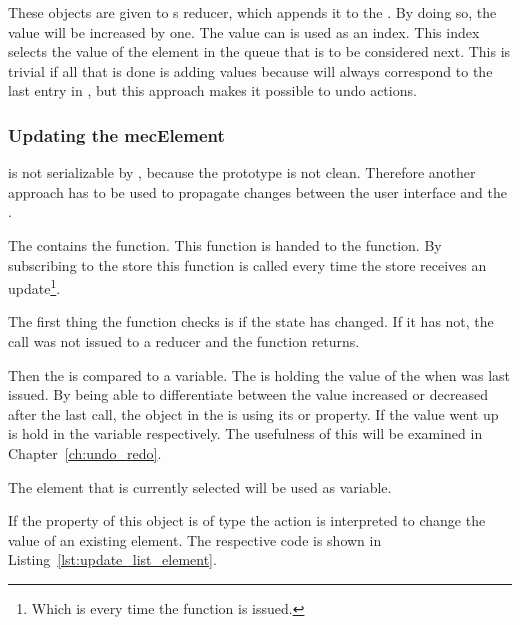 These objects are given to s  reducer, which appends it to the .
By doing so, the  value will be increased by one.
The  value can is used as an index.
This index selects the value of the element in the queue that is to be considered next.
This is trivial if all that is done is adding values because  will always correspond to the last entry in , but this approach makes it possible to undo actions.

\subsubsection{Updating the mecElement}\label{ch:updating_the_mecelement}

 is not serializable by , because the prototype is not clean.
Therefore another approach has to be used to propagate changes between the user interface and the .

The  contains the  function.
This function is handed to the  function.
By subscribing to the store this function is called every time the store receives an update\footnote{Which is every time the  function is issued.}.

The first thing the  function checks is if the  state has changed.
If it has not, the  call was not issued to a  reducer and the function returns.

Then the  is compared to a  variable.
The  is holding the value of the  when  was last issued.
By being able to differentiate between the  value increased or decreased after the last call, the object in the  is using its  or  property.
If the  value went up is hold in the  variable respectively.
The usefulness of this will be examined in Chapter~\ref{ch:undo_redo}.

The  element that is currently selected will be used as  variable.

If the  property of this object is of type  the action is interpreted to change the value of an existing element.
The respective code is shown in Listing~\ref{lst:update_list_element}.

